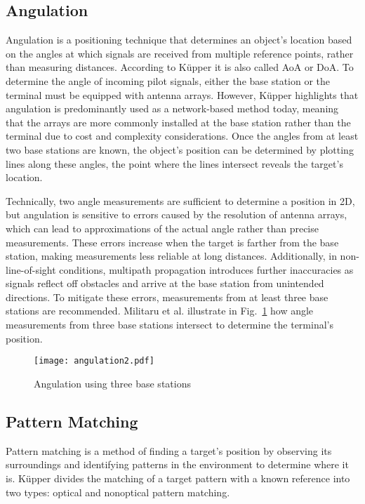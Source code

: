 \subsection{Angulation}
Angulation is a positioning technique that determines an object's location based on the angles at which signals are received from multiple reference points, rather than measuring distances. 
According to K\"upper \cite{kupper2005location} it is also called \ac{AoA} or \ac{DoA}. 
To determine the angle of incoming pilot signals, either the base station or the terminal must be equipped with antenna arrays.
However, K\"upper \cite{kupper2005location} highlights that angulation is predominantly used as a network-based method today, meaning that the arrays are more commonly installed at the base station rather than the terminal due to cost and complexity considerations.
Once the angles from at least two base stations are known, the object's position can be determined by plotting lines along these angles, the point where the lines intersect reveals the target's location. 

Technically, two angle measurements are sufficient to determine a position in 2D, but angulation is sensitive to errors caused by the resolution of antenna arrays, which can lead to approximations of the actual angle rather than precise measurements.
These errors increase when the target is farther from the base station, making measurements less reliable at long distances.
Additionally, in non-line-of-sight conditions, multipath propagation introduces further inaccuracies as signals reflect off obstacles and arrive at the base station from unintended directions. 
To mitigate these errors, measurements from at least three base stations are recommended.
Militaru et al. \cite{militaru2022positioning} illustrate in Fig.~\ref{fig:angulation2} how angle measurements from three base stations intersect to determine the terminal's position.

\begin{figure}[htbp]
    \centering
    \texttt{[image: angulation2.pdf]}
    \caption{Angulation using three base stations \cite{militaru2022positioning}}
    \label{fig:angulation2}
\end{figure}

\subsection{Pattern Matching}
Pattern matching is a method of finding a target's position by observing its surroundings and identifying patterns in the environment to determine where it is.
K\"upper \cite{kupper2005location} divides the matching of a target pattern with a known reference into two types: optical and nonoptical pattern matching.


